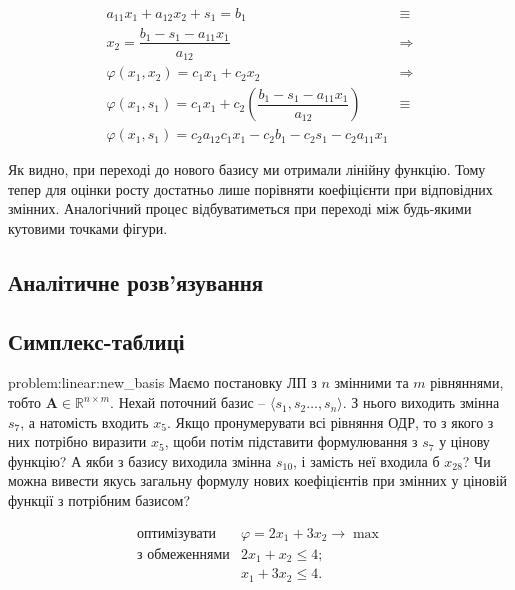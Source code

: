 \documentclass[\main/book.tex]{subfiles}
\begin{document}
\[
  \begin{array}{ll}
    a_{11} x_1 + a_{12} x_2 + s_1 = b_1          & \equiv      \\
    x_2 = \dfrac{b_1 - s_1 - a_{11} x_1}{a_{12}} & \Rightarrow \\
    \varphi(x_1, x_2) = c_1 x_1 + c_2 x_2        & \Rightarrow \\
    \varphi(x_1, s_1) = c_1 x_1 + c_2 \left(
      \dfrac{b_1 - s_1 - a_{11} x_1}{a_{12}}
    \right)                                      & \equiv      \\
    \varphi(x_1, s_1) =
    c_2 a_{12} c_1 x_1 - c_2 b_1 - c_2 s_1 - c_2 a_{11} x_1
  \end{array}
\]

Як видно, при переході до нового базису ми отримали лінійну функцію. Тому тепер для оцінки росту достатньо лише порівняти коефіцієнти при відповідних змінних. Аналогічний процес відбуватиметься при переході між будь-якими кутовими точками фігури.

\subsection{Аналітичне розв'язування}

\subsection{Симплекс-таблиці}


\begin{problem}{problem:linear:new_basis}
 Маємо постановку ЛП з $n$ змінними та $m$ рівняннями, тобто $\mathbf{A} \in \mathbb{R}^{n \times m}$. Нехай поточний базис -- $\langle s_1, s_2 \ldots, s_n \rangle$. З нього виходить змінна $s_7$, а натомість входить $x_5$. Якщо пронумерувати всі рівняння ОДР, то з якого з них потрібно виразити $x_5$, щоби потім підставити формулювання з $s_7$ у цінову функцію? А якби з базису виходила змінна $s_{10}$, і замість неї входила б $x_{28}$? Чи можна вивести якусь загальну формулу нових коефіцієнтів при змінних у ціновій функції з потрібним базисом?
\end{problem}

\begin{equation}
 \begin{array}{rl}
  \text{оптимізувати}  & \varphi = 2 x_1 + 3 x_2 \rightarrow \max \\
  \text{з обмеженнями} & 2 x_1 +   x_2 \leq 4; \\
                       &   x_1 + 3 x_2 \leq 4.
 \end{array}
 \label{eq:linear:simplex:example_task}
\end{equation}
\end{document}

